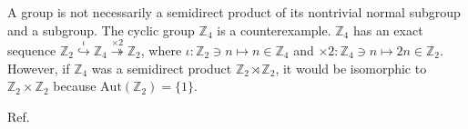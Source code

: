 \documentclass[a4paper, 11pt]{article}
\theoremstyle{definition}
\begin{document}
A group is not necessarily a semidirect product of its nontrivial normal subgroup and a subgroup.
The cyclic group $\mathbb{Z}_{4}$ is a counterexample.
$\mathbb{Z}_{4}$ has an exact sequence $\mathbb{Z}_{2} \overset{\iota}{\hookrightarrow} \mathbb{Z}_{4} \overset{\times 2}{\twoheadrightarrow} \mathbb{Z}_{2}$, where $\iota: \mathbb{Z}_{2} \ni n \mapsto n \in \mathbb{Z}_{4}$ and $\times 2: \mathbb{Z}_{4} \ni n \mapsto 2n \in \mathbb{Z}_{2}$.
However, if $\mathbb{Z}_{4}$ was a semidirect product $\mathbb{Z}_{2} \rtimes \mathbb{Z}_{2}$, it would be isomorphic to $\mathbb{Z}_{2} \times \mathbb{Z}_{2}$ because $\mathrm{Aut}(\mathbb{Z}_{2}) = \{ 1 \}$.

Ref.~\cite{RevModPhys.35.641}




\end{document}
